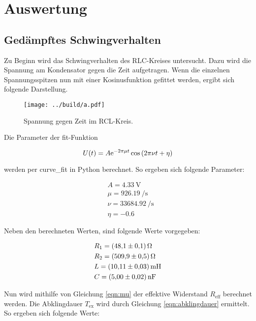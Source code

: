 


\section{Auswertung}
\label{sec:Auswertung}

\subsection{Gedämpftes Schwingverhalten}

\noindent Zu Beginn wird das Schwingverhalten des RLC-Kreises untersucht. Dazu wird die Spannung am Kondensator gegen die Zeit aufgetragen. 
Wenn die einzelnen Spannungsspitzen nun mit einer Kosinusfunktion gefittet werden, ergibt sich folgende Darstellung.

\begin{figure}
    \texttt{[image: ../build/a.pdf]}
    \caption{Spannung gegen Zeit im RCL-Kreis.}
\end{figure}

\noindent Die Parameter der fit-Funktion

\begin{equation}
    U(t)= A \text e ^{-2\pi\mu t} \cos{ \left(2 \pi \nu t + \eta \right)}
\end{equation}

\noindent werden per curve\_fit in Python berechnet.
So ergeben sich folgende Parameter:

\begin{align}
    & A     = \qty{4.33}{\volt}       \\
    &\mu    = \qty{926.19}{\per \second}   \\
    &\nu    = \qty{33684.92}{\per \second} \\
    &\eta   = \qty{-0.6}{}
\end{align}

\noindent Neben den berechneten Werten, sind folgende Werte vorgegeben:

\begin{align}
    &R_1 =  \qty{48.1 \pm 0.1}{\ohm}    \\
    &R_2 =  \qty{509.9 \pm 0.5}{\ohm}   \\
    &L  =   \qty{10.11 \pm 0.03}{\milli \henry}\\
    &C  =   \qty{5 \pm 0.02}{\nano \farad}
\end{align}

\noindent Nun wird mithilfe von Gleichung \eqref{eqn:mu} der effektive Widerstand $R_{\text{eff}}$ berechnet werden. Die Abklingdauer $T_{\text{ex}}$ wird 
durch Gleichung \eqref{eqn:abklingdauer} ermittelt. So ergeben sich folgende Werte:

